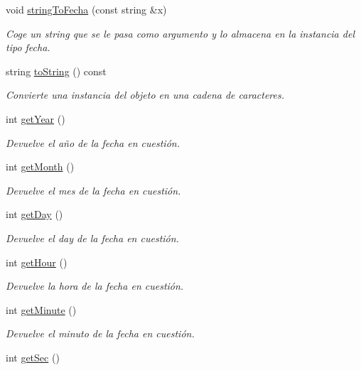 \begin{DoxyCompactItemize}
\item 
void \hyperlink{classfecha_a701f273db0e9d4f06130885050959a02}{string\-To\-Fecha} (const string \&x)
\begin{DoxyCompactList}\small\item\em Coge un string que se le pasa como argumento y lo almacena en la instancia del tipo fecha. \end{DoxyCompactList}\item 
string \hyperlink{classfecha_a26d22b980284408eac0da084f358c43b}{to\-String} () const 
\begin{DoxyCompactList}\small\item\em Convierte una instancia del objeto en una cadena de caracteres. \end{DoxyCompactList}\item 
int \hyperlink{classfecha_aba5e861a7ad432219c9e1caa3fc2a2c3}{get\-Year} ()
\begin{DoxyCompactList}\small\item\em Devuelve el año de la fecha en cuestión. \end{DoxyCompactList}\item 
int \hyperlink{classfecha_a139cadcea490869e4e297f1108739394}{get\-Month} ()
\begin{DoxyCompactList}\small\item\em Devuelve el mes de la fecha en cuestión. \end{DoxyCompactList}\item 
int \hyperlink{classfecha_abf942ae9badb565bd94abfc3b843dfa7}{get\-Day} ()
\begin{DoxyCompactList}\small\item\em Devuelve el day de la fecha en cuestión. \end{DoxyCompactList}\item 
int \hyperlink{classfecha_ad5d69ad84e9ff0cd627a9dbfc733fcb3}{get\-Hour} ()
\begin{DoxyCompactList}\small\item\em Devuelve la hora de la fecha en cuestión. \end{DoxyCompactList}\item 
int \hyperlink{classfecha_a7f19b4b179ed865b7d714a55aa041d79}{get\-Minute} ()
\begin{DoxyCompactList}\small\item\em Devuelve el minuto de la fecha en cuestión. \end{DoxyCompactList}\item 
int \hyperlink{classfecha_ad8da98b1a9e43de1148cc3e13b9102fd}{get\-Sec} ()

\end{DoxyCompactItemize}
